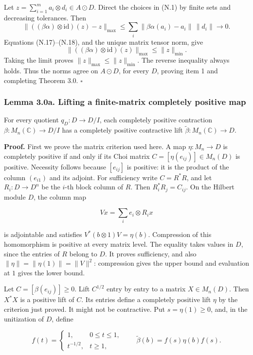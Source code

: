 \documentclass[
  11pt,
]{article}
\begin{document}
Let \(z=\sum_{i=1}^m a_i\otimes d_i\in A\odot D\). Direct the choices in
(N.1) by finite sets and decreasing tolerances. Then \[
\|((\beta\alpha)\otimes\mathrm{id})(z)-z\|_{\max}
\leq\sum_i\|\beta\alpha(a_i)-a_i\|\,\|d_i\|\longrightarrow0.
\] Equations (N.17)--(N.18), and the unique matrix tensor norm, give \[
\|((\beta\alpha)\otimes\mathrm{id})(z)\|_{\max}
\leq\|z\|_{\min}.
\] Taking the limit proves \(\|z\|_{\max}\leq\|z\|_{\min}\). The reverse
inequality always holds. Thus the norms agree on \(A\odot D\), for every
\(D\), proving item 1 and completing Theorem 3.0. \(\square\)

\subsubsection{Lemma 3.0a. Lifting a finite-matrix completely positive
map}\label{lemma-3.0a.-lifting-a-finite-matrix-completely-positive-map}

For every quotient \(q_D:D\to D/I\), each completely positive
contraction \(\beta:M_n(\mathbb C)\to D/I\) has a completely positive
contractive lift \(\widetilde\beta:M_n(\mathbb C)\to D\).

\textbf{Proof.} First we prove the matrix criterion used here. A map
\(\eta:M_n\to D\) is completely positive if and only if its Choi matrix
\(C=[\eta(e_{ij})]\in M_n(D)\) is positive. Necessity follows because
\([e_{ij}]\) is positive: it is the product of the column \((e_{i1})\)
and its adjoint. For sufficiency write \(C=R^*R\), and let
\(R_i:D\to D^n\) be the \(i\)-th block column of \(R\). Then
\(R_i^*R_j=C_{ij}\). On the Hilbert module \(D\), the column map

\[
Vx=\sum_i e_i\otimes R_ix
\]

is adjointable and satisfies \(V^*(b\otimes1)V=\eta(b)\). Compression of
this homomorphism is positive at every matrix level. The equality takes
values in \(D\), since the entries of \(R\) belong to \(D\). It proves
sufficiency, and also \(\|\eta\|=\|\eta(1)\|=\|V\|^2\): compression
gives the upper bound and evaluation at \(1\) gives the lower bound.

Let \(C=[\beta(e_{ij})]\geq0\). Lift \(C^{1/2}\) entry by entry to a
matrix \(X\in M_n(D)\). Then \(X^*X\) is a positive lift of \(C\). Its
entries define a completely positive lift \(\eta\) by the criterion just
proved. It might not be contractive. Put \(s=\eta(1)\geq0\), and, in the
unitization of \(D\), define

\[
f(t)=\begin{cases}1,&0\leq t\leq1,\\t^{-1/2},&t\geq1,\end{cases}
\qquad
\widetilde\beta(b)=f(s)\eta(b)f(s).
\]
\end{document}
